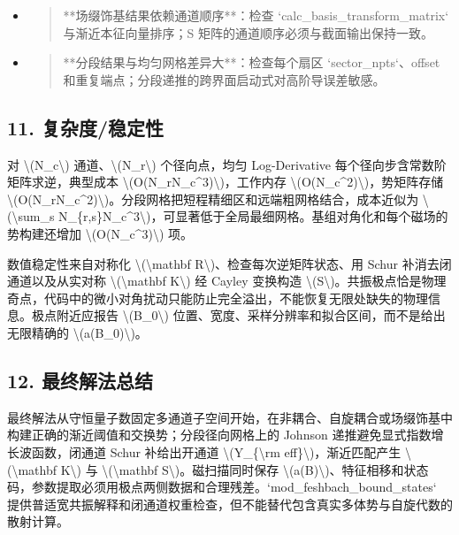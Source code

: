 \documentclass[UTF8,openany,11pt,fontset=fandol]{ctexbook}
\begin{document}
\begin{itemize}
\begin{quote}
  \textbackslash(a\_\{\textbackslash rm
  bg\}\textbackslash)，它不是全区间非线性最小二乘。对弱扫点或多峰数据应改用自建目标函数。
  \end{quote}
\item
  \begin{quote}
  **场缀饰基结果依赖通道顺序**：检查 `calc\_basis\_transform\_matrix`
  与渐近本征向量排序；S 矩阵的通道顺序必须与截面输出保持一致。
  \end{quote}
\item
  \begin{quote}
  **分段结果与均匀网格差异大**：检查每个扇区 `sector\_npts`、offset
  和重复端点；分段递推的跨界面启动式对高阶导误差敏感。
  \end{quote}
\end{itemize}

\subsection{\texorpdfstring{\textbf{11.
复杂度/稳定性}}{11. 复杂度/稳定性}}\label{ux590dux6742ux5ea6ux7a33ux5b9aux6027-2}

对 \textbackslash(N\_c\textbackslash)
通道、\textbackslash(N\_r\textbackslash) 个径向点，均匀 Log-Derivative
每个径向步含常数阶矩阵求逆，典型成本
\textbackslash(O(N\_rN\_c\^{}3)\textbackslash)，工作内存
\textbackslash(O(N\_c\^{}2)\textbackslash)，势矩阵存储
\textbackslash(O(N\_rN\_c\^{}2)\textbackslash)。分段网格把短程精细区和远端粗网格结合，成本近似为
\textbackslash(\textbackslash sum\_s
N\_\{r,s\}N\_c\^{}3\textbackslash)，可显著低于全局最细网格。基组对角化和每个磁场的势构建还增加
\textbackslash(O(N\_c\^{}3)\textbackslash) 项。

数值稳定性来自对称化 \textbackslash(\textbackslash mathbf
R\textbackslash)、检查每次逆矩阵状态、用 Schur 补消去闭通道以及从实对称
\textbackslash(\textbackslash mathbf K\textbackslash) 经 Cayley 变换构造
\textbackslash(S\textbackslash)。共振极点恰是物理奇点，代码中的微小对角扰动只能防止完全溢出，不能恢复无限处缺失的物理信息。极点附近应报告
\textbackslash(B\_0\textbackslash)
位置、宽度、采样分辨率和拟合区间，而不是给出无限精确的
\textbackslash(a(B\_0)\textbackslash)。

\subsection{\texorpdfstring{\textbf{12.
最终解法总结}}{12. 最终解法总结}}\label{ux6700ux7ec8ux89e3ux6cd5ux603bux7ed3-2}

最终解法从守恒量子数固定多通道子空间开始，在非耦合、自旋耦合或场缀饰基中构建正确的渐近阈值和交换势；分段径向网格上的
Johnson 递推避免显式指数增长波函数，闭通道 Schur 补给出开通道
\textbackslash(Y\_\{\textbackslash rm eff\}\textbackslash)，渐近匹配产生
\textbackslash(\textbackslash mathbf K\textbackslash) 与
\textbackslash(\textbackslash mathbf S\textbackslash)。磁扫描同时保存
\textbackslash(a(B)\textbackslash)、特征相移和状态码，参数提取必须用极点两侧数据和合理残差。`mod\_feshbach\_bound\_states`
提供普适宽共振解释和闭通道权重检查，但不能替代包含真实多体势与自旋代数的散射计算。
\end{document}
